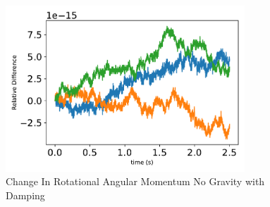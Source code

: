 \begin{figure}[htbp]\centerline{\includegraphics[width=0.8\textwidth]{AutoTeX/ChangeInRotationalAngularMomentumNoGravityDamping}}\caption{Change In Rotational Angular Momentum No Gravity with Damping}\label{fig:ChangeInRotationalAngularMomentumNoGravityDamping}\end{figure}